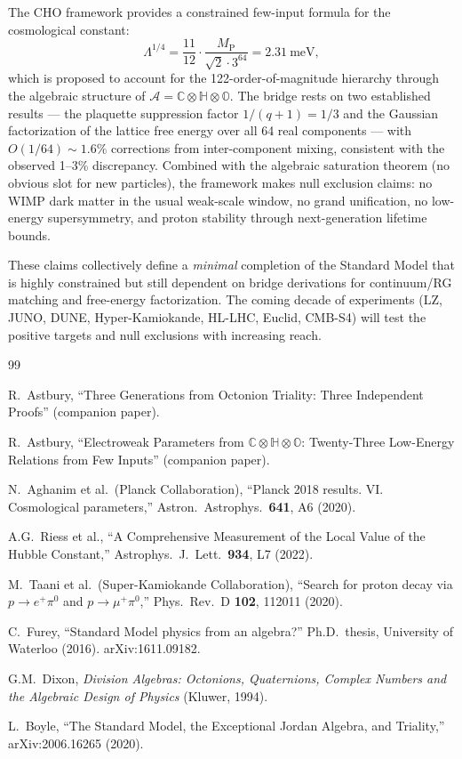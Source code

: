 \documentclass[12pt,a4paper]{article}
\theoremstyle{definition}
\theoremstyle{remark}
\newcommand{\Oct}{\mathbb{O}}
\newcommand{\Quat}{\mathbb{H}}
\newcommand{\Comp}{\mathbb{C}}
\newcommand{\Alg}{\mathcal{A}}
\newcommand{\MP}{M_{\mathrm{P}}}
\begin{document}
The CHO framework provides a constrained few-input formula for the cosmological 
constant:
\begin{equation}
\Lambda^{1/4} = \frac{11}{12}\cdot\frac{\MP}{\sqrt{2}\cdot 3^{64}} 
= 2.31~\text{meV},
\end{equation}
which is proposed to account for the 122-order-of-magnitude hierarchy through the algebraic 
structure of $\Alg = \Comp\otimes\Quat\otimes\Oct$. The bridge rests on 
two established results --- the plaquette suppression factor $1/(q+1) = 1/3$ 
and the Gaussian factorization of the lattice free energy over all 64 real 
components --- with $O(1/64) \sim 1.6\%$ corrections from inter-component 
mixing, consistent with the observed 1--3\% discrepancy. Combined with the 
algebraic saturation theorem (no obvious slot for new particles), the framework 
makes null exclusion claims: no WIMP dark matter in the usual weak-scale window, 
no grand unification, no low-energy supersymmetry, and proton stability through 
next-generation lifetime bounds.

These claims collectively define a \emph{minimal} completion of the 
Standard Model that is highly constrained but still dependent on bridge 
derivations for continuum/RG matching and free-energy factorization. The coming decade of 
experiments (LZ, JUNO, DUNE, Hyper-Kamiokande, HL-LHC, Euclid, CMB-S4) 
will test the positive targets and null exclusions with increasing reach.

\begin{thebibliography}{99}

R.~Astbury, ``Three Generations from Octonion Triality: 
Three Independent Proofs'' (companion paper).

R.~Astbury, ``Electroweak Parameters from 
$\Comp\otimes\Quat\otimes\Oct$: Twenty-Three Low-Energy Relations from Few Inputs'' 
(companion paper).

N.~Aghanim et al.\ (Planck Collaboration),
``Planck 2018 results. VI. Cosmological parameters,''
Astron.\ Astrophys.\ \textbf{641}, A6 (2020).

A.G.~Riess et al.,
``A Comprehensive Measurement of the Local Value of the Hubble Constant,''
Astrophys.\ J.\ Lett.\ \textbf{934}, L7 (2022).

M.~Taani et al.\ (Super-Kamiokande Collaboration),
``Search for proton decay via $p\to e^+\pi^0$ and $p\to\mu^+\pi^0$,''
Phys.\ Rev.\ D \textbf{102}, 112011 (2020).

C.~Furey, ``Standard Model physics from an algebra?''
Ph.D.\ thesis, University of Waterloo (2016). arXiv:1611.09182.

G.M.~Dixon, \emph{Division Algebras: Octonions, Quaternions, Complex Numbers 
and the Algebraic Design of Physics} (Kluwer, 1994).

L.~Boyle, ``The Standard Model, the Exceptional Jordan Algebra, and Triality,''
arXiv:2006.16265 (2020).

\end{thebibliography}
\end{document}
